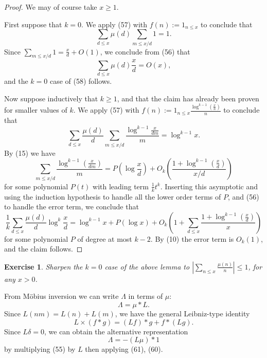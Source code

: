 \documentclass[10pt,reqno]{amsart}
\newtheorem{exercise}[theorem]{Exercise}
\begin{document}
\begin{proof}
    We may of course take $x \geq 1$.

    First suppose that $k=0$. We apply (57) with $f(n) := 1_{n \leq x}$ to conclude that
    \begin{equation}   \sum_{d \leq x} \mu(d) \sum_{m \leq x/d} 1 = 1. \end{equation}
    Since $\sum_{m \leq x/d} 1 = \frac{x}{d} + O(1)$, we conclude from (56) that
    \[  \sum_{d \leq x} \mu(d) \frac{x}{d} = O(x),\]
    and the $k=0$ case of (58) follows.

    Now suppose inductively that $k \geq 1$, and that the claim has already been proven for smaller values of $k$. We apply (57) with $f(n) := 1_{n \leq x} \frac{\log^{k-1}(\frac{x}{n})}{n}$ to conclude that
    \[  \sum_{d \leq x} \frac{\mu(d)}{d} \sum_{m \leq x/d} \frac{\log^{k-1} \frac{x}{dm}}{m} = \log^{k-1} x.\]
    By (15) we have
    \[  \sum_{m \leq x/d} \frac{\log^{k-1}\left(\frac{x}{dm}\right)}{m} = P \left( \log \frac{x}{d} \right) + O_k \left( \frac{1 + \log^{k-1}(\frac{x}{d})}{x/d} \right) \]
    for some polynomial $P(t)$ with leading term $\frac{1}{k} t^k$. Inserting this asymptotic and using the induction hypothesis to handle all the lower order terms of $P$, and (56) to handle the error term, we conclude that
    \[  \frac{1}{k} \sum_{d \leq x} \frac{\mu(d)}{d} \log^k \frac{x}{d} = \log^{k-1} x + P( \log x ) + O_k(1 + \sum_{d \leq x} \frac{1 + \log^{k-1} \left( \frac{x}{d} \right)}{x} ) \]
    for some polynomial $P$ of degree at most $k-2$. By (10) the error term is $O_k(1)$, and the claim follows. %
\end{proof}

\begin{exercise}
    Sharpen the $k=0$ case of the above lemma to $|\sum_{n \leq x} \frac{\mu(n)}{n}| \leq 1$, for any $x>0$.
\end{exercise}

From Möbius inversion we can write $\Lambda$ in terms of $\mu$:
%
\begin{equation}   \Lambda = \mu * L. \end{equation}
%
Since $L(nm) = L(n) + L(m)$, we have the general Leibniz-type identity
%
\begin{equation}   L \times (f * g) = (Lf)*g + f * (Lg). \end{equation}
%
Since $L\delta = 0$, we can obtain the alternative representation
%
\begin{equation}   \Lambda = -(L\mu) * 1 \end{equation}
%
by multiplying (55) by $L$ then applying (61), (60).
\end{document}
